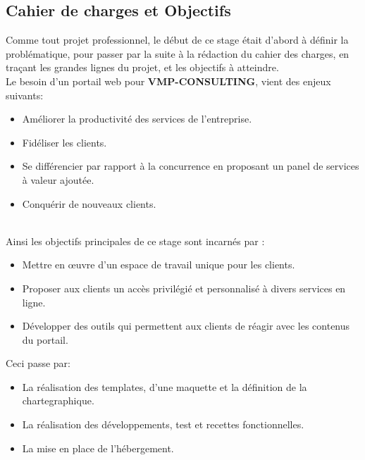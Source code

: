 \documentclass[12pt]{article}
\begin{document}
\subsection{Cahier de charges et Objectifs}

Comme tout projet professionnel, le début de ce stage était d'abord à définir la 
problématique,  pour passer par la suite à la rédaction du cahier des charges, en 
traçant  les grandes lignes du projet, et les objectifs à atteindre.\\ 

Le besoin d'un portail web pour \textbf{VMP-CONSULTING}, vient des enjeux suivants: \\

\begin{itemize}
\item Améliorer la productivité des services de l'entreprise.
\item Fidéliser les clients.
\item Se différencier par rapport à la concurrence en proposant un panel de services à
valeur ajoutée.
\item Conquérir de nouveaux clients.
\end{itemize}

\\

Ainsi les objectifs principales de ce stage sont incarnés par  :\\
\begin{itemize}
\item Mettre en œuvre d'un espace de travail unique pour les clients.
\item Proposer aux clients un accès privilégié et personnalisé à divers services en
ligne.
\item Développer des outils qui permettent aux clients de réagir avec les contenus du
portail.

\end{itemize}

 Ceci passe par: \\
\begin{itemize}
\item La réalisation des templates, d'une maquette et la définition de la chartegraphique.
\item La réalisation des développements, test et recettes fonctionnelles.
\item  La mise en place de l'hébergement.
\end{itemize} \\
\end{document}

